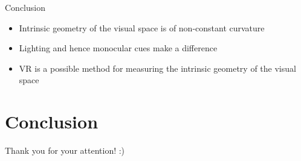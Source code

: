 \documentclass{beamer}
\begin{document}
\begin{frame}{Conclusion}
    \begin{itemize}
        \item Intrinsic geometry of the visual space is of non-constant curvature 
        \item Lighting and hence monocular cues make a difference
        \item VR is a possible method for measuring the intrinsic geometry of the visual space
    \end{itemize}
\end{frame}

\section{Conclusion}

\begin{frame}{}
    \large{Thank you for your attention! :)}
\end{frame}
\end{document}
